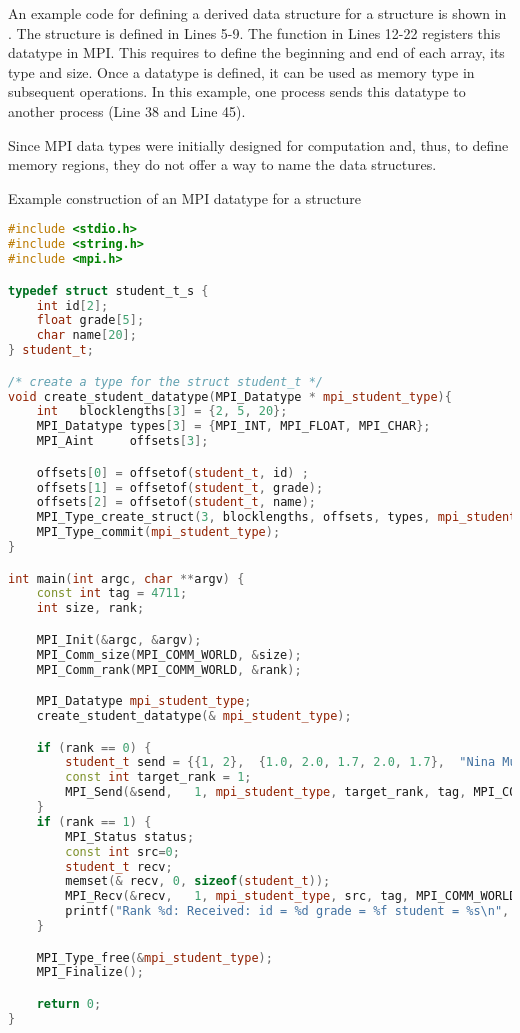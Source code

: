 An example code for defining a derived data structure for a structure is shown in .
The structure is defined in Lines 5-9.
The function in Lines 12-22 registers this datatype in MPI.
This requires to define the beginning and end of each array, its type and size.
Once a datatype is defined, it can be used as memory type in subsequent operations.
In this example, one process sends this datatype to another process (Line 38 and Line 45).

Since MPI data types were initially designed for computation and, thus, to define memory regions, they do not offer a way to name the data structures.

\begin{tcbcode}[label={lst:mpi-struct}]{Example construction of an MPI datatype for a structure}
\begin{lstlisting}[language=c++,morekeywords={{student_t}}]
#include <stdio.h>
#include <string.h>
#include <mpi.h>

typedef struct student_t_s {
    int id[2];
    float grade[5];
    char name[20];
} student_t;

/* create a type for the struct student_t */
void create_student_datatype(MPI_Datatype * mpi_student_type){
    int   blocklengths[3] = {2, 5, 20};
    MPI_Datatype types[3] = {MPI_INT, MPI_FLOAT, MPI_CHAR};
    MPI_Aint     offsets[3];

    offsets[0] = offsetof(student_t, id) ;
    offsets[1] = offsetof(student_t, grade);
    offsets[2] = offsetof(student_t, name);
    MPI_Type_create_struct(3, blocklengths, offsets, types, mpi_student_type);
    MPI_Type_commit(mpi_student_type);
}

int main(int argc, char **argv) {
    const int tag = 4711;
    int size, rank;

    MPI_Init(&argc, &argv);
    MPI_Comm_size(MPI_COMM_WORLD, &size);
    MPI_Comm_rank(MPI_COMM_WORLD, &rank);

    MPI_Datatype mpi_student_type;
    create_student_datatype(& mpi_student_type);

    if (rank == 0) {
        student_t send = {{1, 2},  {1.0, 2.0, 1.7, 2.0, 1.7},  "Nina Musterfrau"};
        const int target_rank = 1;
        MPI_Send(&send,   1, mpi_student_type, target_rank, tag, MPI_COMM_WORLD);
    }
    if (rank == 1) {
        MPI_Status status;
        const int src=0;
        student_t recv;
        memset(& recv, 0, sizeof(student_t));
        MPI_Recv(&recv,   1, mpi_student_type, src, tag, MPI_COMM_WORLD, &status);
        printf("Rank %d: Received: id = %d grade = %f student = %s\n", rank, recv.id[0], recv.grade[0], recv.name);
    }

    MPI_Type_free(&mpi_student_type);
    MPI_Finalize();

    return 0;
}
\end{lstlisting}
\end{tcbcode}




